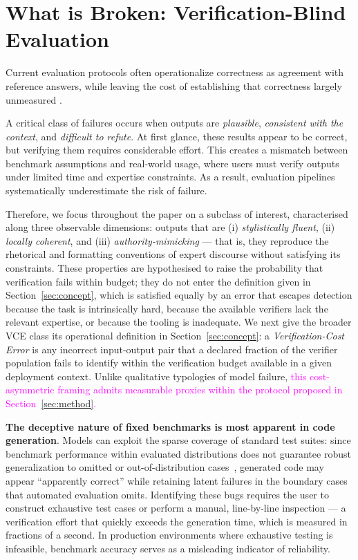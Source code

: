 \documentclass[11pt]{article}
\newcommand{\rev}[1]{\textcolor{magenta}{#1}}
\newcommand{\cfix}[1]{\textcolor{green!50!black}{#1}}
\newcommand{\tidy}[1]{\textcolor{blue!60!black}{#1}}
\newcommand{\viola}[1]{\textcolor[HTML]{7030A0}{#1}}
\newcommand{\rev}[1]{#1}
\newcommand{\cfix}[1]{#1}
\newcommand{\tidy}[1]{#1}
\newcommand{\viola}[1]{#1}
\begin{document}
\section{What is Broken: Verification-Blind Evaluation}
\label{sec:broken}

Current evaluation protocols often operationalize correctness as agreement with reference answers, while leaving the cost of establishing that correctness largely unmeasured \citep{liang2023helm,kiela2021dynabench,gururangan2018annotation,deng2024contamination}.

A critical class of failures occurs when outputs are \emph{plausible}, \emph{consistent with the context}, and \emph{difficult to refute}.
At first glance, these results appear to be correct, but verifying them requires considerable effort.
This creates a mismatch between benchmark assumptions and real-world usage, where users must verify outputs under limited time and expertise constraints. As a result, evaluation pipelines systematically underestimate the risk of failure.

\viola{Therefore, we focus throughout the paper on a subclass of interest, characterised along three observable dimensions: outputs that are (i) \emph{stylistically fluent}, (ii) \emph{locally coherent}, and (iii) \emph{authority-mimicking} --- that is, they reproduce the rhetorical and formatting conventions of expert discourse without satisfying its constraints. These properties are hypothesised to raise the probability that verification fails within budget; they do not enter the definition given in Section~\ref{sec:concept}, which is satisfied equally by an error that escapes detection because the task is intrinsically hard, because the available verifiers lack the relevant expertise, or because the tooling is inadequate.} \viola{We next give the broader VCE class its operational definition in Section~\ref{sec:concept}:}
\viola{a \emph{Verification-Cost Error} is any incorrect input-output pair that a declared fraction of the verifier population fails to identify within the verification budget available in a given deployment context.} Unlike qualitative typologies of model failure, \rev{this cost-asymmetric framing admits measurable proxies within the protocol proposed in Section~\ref{sec:method}.}

\textbf{The deceptive nature of fixed benchmarks is most apparent in code generation}. \tidy{Models can exploit the sparse coverage of standard test suites:} \cfix{since benchmark performance within evaluated distributions does not guarantee robust generalization to omitted or out-of-distribution cases~\citep{liang2023helm}, generated code may appear ``apparently correct'' while retaining latent failures} \tidy{in the boundary cases that automated evaluation omits.}
Identifying these bugs requires the user to construct exhaustive test cases or perform a manual, line-by-line inspection --- a verification effort that quickly exceeds the generation time, which is measured in fractions of a second.
In production environments where exhaustive testing is infeasible, benchmark accuracy serves as a misleading indicator of reliability.
\end{document}
